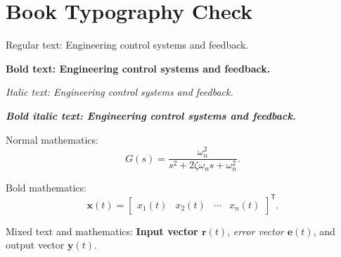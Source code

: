 \documentclass[12pt,letterpaper]{article}
\begin{document}
\section*{Book Typography Check}

Regular text: Engineering control systems and feedback.

\textbf{Bold text: Engineering control systems and feedback.}

\textit{Italic text: Engineering control systems and feedback.}

\textbf{\textit{Bold italic text: Engineering control systems and feedback.}}

Normal mathematics:
\[
  G(s) = \frac{\omega_n^2}{s^2 + 2\zeta\omega_n s + \omega_n^2}.
\]

Bold mathematics:
\[
  \symbf{x}(t) =
  \begin{bmatrix}
    x_1(t) & x_2(t) & \cdots & x_n(t)
  \end{bmatrix}^{\mathsf{T}}.
\]

Mixed text and mathematics:
\textbf{Input vector $\symbf{r}(t)$},
\textit{error vector $\symbf{e}(t)$}, and
output vector $\symbf{y}(t)$.
\end{document}
